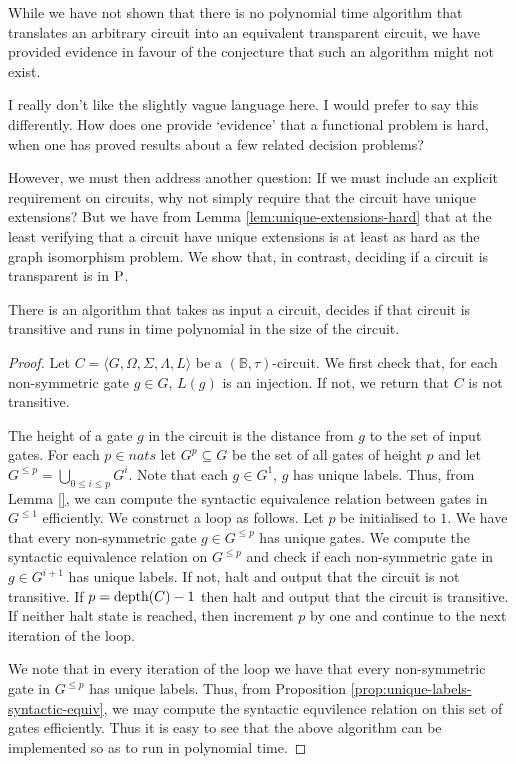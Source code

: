 \documentclass[../paper.tex]{subfiles}
\begin{document}
While we have not shown that there is no polynomial time algorithm that
translates an arbitrary circuit into an equivalent transparent circuit, we have
provided evidence in favour of the conjecture that such an algorithm might not
exist.

\begin{remark}
  I really don't like the slightly vague language here. I would prefer to say
  this differently. How does one provide `evidence' that a functional problem is
  hard, when one has proved results about a few related decision problems?
\end{remark}

However, we must then address another question: If we must include an explicit
requirement on circuits, why not simply require that the circuit have unique
extensions? But we have from Lemma \ref{lem:unique-extensions-hard} that at the
least verifying that a circuit have unique extensions is at least as hard as the
graph isomorphism problem. We show that, in contrast, deciding if a circuit is
transparent is in $\mathrm{P}$.

\begin{prop}
  There is an algorithm that takes as input a circuit, decides if that circuit
  is transitive and runs in time polynomial in the size of the circuit.
  \label{prop:tansitive-polynomial-time}
\end{prop}
\begin{proof}
  Let $C = \langle G, \Omega, \Sigma, \Lambda, L \rangle$ be a $(\mathbb{B},
  \tau)$-circuit. We first check that, for each non-symmetric gate $g \in G$,
  $L(g)$ is an injection. If not, we return that $C$ is not transitive.

  The height of a gate $g$ in the circuit is the distance from $g$ to the set of
  input gates. For each $p \in nats$ let $G^p \subseteq G$ be the set of all
  gates of height $p$ and let $G^{\leq p} = \bigcup_{0 \leq i \leq p}G^i$. Note
  that each $g \in G^1$, $g$ has unique labels. Thus, from Lemma \ref{}, we can
  compute the syntactic equivalence relation between gates in $G^{\leq 1}$
  efficiently. We construct a loop as follows. Let $p$ be initialised to $1$. We
  have that every non-symmetric gate $g \in G^{\leq p}$ has unique gates. We
  compute the syntactic equivalence relation on $G^{\leq p}$ and check if each
  non-symmetric gate in $g \in G^{i + 1}$ has unique labels. If not, halt and
  output that the circuit is not transitive. If $p = \text{depth}(C) -1$ then halt and
  output that the circuit is transitive. If neither halt state is reached, then
  increment $p$ by one and continue to the next iteration of the loop.

  We note that in every iteration of the loop we have that every non-symmetric
  gate in $G^{\leq p}$ has unique labels. Thus, from Proposition
  \ref{prop:unique-labels-syntactic-equiv}, we may compute the syntactic
  equvilence relation on this set of gates efficiently. Thus it is easy to see
  that the above algorithm can be implemented so as to run in polynomial time.
\end{proof}
\end{document}
